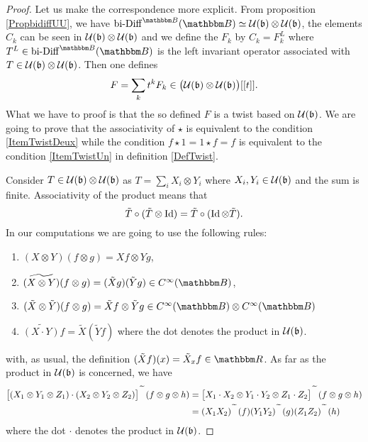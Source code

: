 \begin{proof}
	Let us make the correspondence more explicit. From proposition \ref{PropbidiffUU}, we have $\biDiff^{\eB}(\eB)\simeq\mU(\lB)\otimes\mU(\lB)$, the elements $C_k$ can be seen in $\mathcal{U}(\mathfrak{b})\otimes\mathcal{U}(\mathfrak{b})$ and we define the $F_k$ by $C_k=F_k^L$ where $T^L\in\biDiff^{\eB}(\eB)$ is the left invariant operator associated with $T\in\mathcal{U}(\mathfrak{b})\otimes\mathcal{U}(\mathfrak{b})$. Then one defines
	\begin{equation}
		F=\sum_kt^kF_k\in\big( \mathcal{U}(\mathfrak{b})\otimes\mathcal{U}(\mathfrak{b}) \big)[[t]].
	\end{equation}
	What we have to proof is that the so defined $F$ is a twist based on $\mathcal{U}(\mathfrak{b})$. We are going to prove that the associativity of $\star$ is equivalent to the condition \ref{ItemTwistDeux} while the condition $f\star 1=1\star f=f$ is equivalent to the condition \ref{ItemTwistUn} in definition \ref{DefTwist}.

	Consider $T\in\mathcal{U}(\mathfrak{b})\otimes\mathcal{U}(\mathfrak{b})$ as $T=\sum_i X_i\otimes Y_i$ where $X_i,Y_i\in\mathcal{U}(\mathfrak{b})$ and the sum is finite. Associativity of the product means that
	\begin{equation}
		\tilde T\circ(\tilde T\otimes \operatorname{Id})=\tilde T\circ(\operatorname{Id}\otimes \tilde T).
	\end{equation}
	In our computations we are going to use the following rules:
	\begin{enumerate}

		\item
			$(X\otimes Y)(f\otimes g)=Xf\otimes Yg$,
		\item	 \label{ItemOptimRuleDeux}
			$\widetilde{(X\otimes Y)}(f\otimes g)=(\tilde Xg)(\tilde Yg)\in  C^{\infty}(\eB)$,
		\item
			$(\tilde X\otimes \tilde Y)(f\otimes g)=\tilde Xf\otimes \tilde Yg\in C^{\infty}(\eB)\otimes C^{\infty}(\eB)$
		\item
			$\widetilde{(X\cdot Y)}f=\tilde X(\tilde Yf)$ where the dot denotes the product in $\mathcal{U}(\mathfrak{b})$.

	\end{enumerate}
	with, as usual, the definition $(\tilde Xf)(x)=\tilde X_xf\in \eR$. As far as the product in $\mathcal{U}(\mathfrak{b})$ is concerned, we have
	\begin{equation}
		\begin{aligned}[]
			\big[ (X_1\otimes Y_1\otimes Z_1)\cdot (X_2\otimes Y_2\otimes Z_2) \big]^{\expotilde}(f\otimes g\otimes h)&=
			\big[ X_1\cdot X_2\otimes Y_1\cdot Y_2\otimes Z_1\cdot Z_2 \big]^{\expotilde}(f\otimes g\otimes h)\\
			&=(X_1X_2)^{\expotilde}(f)(Y_1Y_2)^{\expotilde}(g)(Z_1Z_2)^{\expotilde}(h)
		\end{aligned}
	\end{equation}
	where the dot $\cdot$ denotes the product in $\mathcal{U}(\mathfrak{b})$. 
	

\end{proof}
